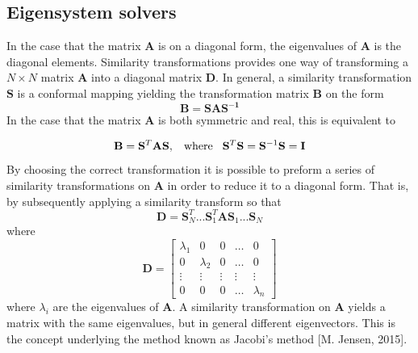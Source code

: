 \documentclass[%
reprint,
amsmath,amssymb,
aps,
]{revtex4-1}
\begin{document}
\subsection{Eigensystem solvers} \noindent 
In the case that the matrix $\mathbf{A}$ is on a diagonal form, the eigenvalues of $\mathbf{A}$ is the diagonal elements. Similarity transformations provides one way of transforming a $N\times N$ matrix $\mathbf{A}$ into a diagonal matrix $\mathbf{D}$. In general, a similarity transformation $\mathbf{S}$ is a conformal mapping yielding the transformation matrix $\mathbf{B}$ on the form
\begin{equation*}
	\mathbf{B} = \mathbf{SAS^{-1}}
\end{equation*}
\noindent In the case that the matrix $\mathbf{A}$ is both symmetric and real, this is equivalent to  

\begin{equation*} \label{eq2}
\mathbf{B} = \mathbf{S}^T\mathbf{A}\mathbf{S}, \hspace{3mm} \textnormal{where} \hspace{3mm} \mathbf{S}^T\mathbf{S} = \mathbf{S}^{-1}\mathbf{S} = \mathbf{I}
\end{equation*}
By choosing the correct transformation it is possible to preform a series of similarity transformations on $\mathbf{A}$ in order to reduce it to a diagonal form. That is, by subsequently applying a similarity transform so that 
\begin{equation*}
\mathbf{D} = \mathbf{S}_N^T...\mathbf{S}_1^T\mathbf{A}\mathbf{S}_1...\mathbf{S}_N 
\end{equation*}
where 
\begin{equation*}
	\mathbf{D} = \begin{bmatrix}
	\lambda_1 & 0 & 0 & \dots & 0 \\
	0 & \lambda_2 & 0 & \dots & 0 \\
	\vdots & \vdots & \vdots &\vdots&\vdots\\
	0 & 0 & 0 &\dots & \lambda_n
	\end{bmatrix}
\end{equation*}
where $\lambda_i$ are the eigenvalues of $\mathbf{A}$. A similarity transformation on $\mathbf{A}$ yields a matrix with the same eigenvalues, but in general different eigenvectors. This is the concept underlying the method known as Jacobi's method [M. Jensen, 2015].
\end{document}
